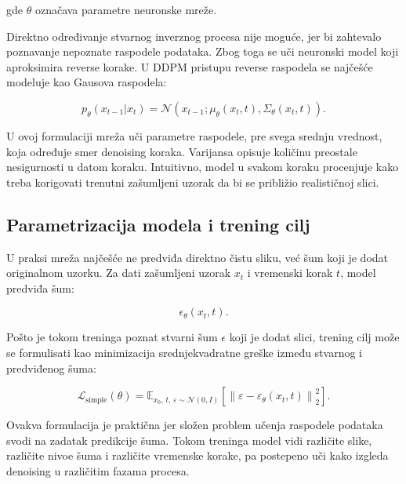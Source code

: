 \documentclass[10pt]{article}
\begin{document}
	gde $\theta$ označava parametre neuronske mreže.
	
	Direktno određivanje stvarnog inverznog procesa nije moguće, jer bi zahtevalo poznavanje nepoznate raspodele podataka. Zbog toga se uči neuronski model koji aproksimira reverse korake. \newline U DDPM pristupu reverse raspodela se najčešće modeluje kao Gausova raspodela:
	
	\begin{equation}
		p_\theta(x_{t-1}|x_t) =
		\mathcal{N}(x_{t-1}; \mu_\theta(x_t,t), \Sigma_\theta(x_t,t)).
	\end{equation} \newline
	
	U ovoj formulaciji mreža uči parametre raspodele, pre svega srednju vrednost, koja određuje smer denoising koraka. Varijansa opisuje količinu preostale nesigurnosti u datom koraku. \newline Intuitivno, model u svakom koraku procenjuje kako treba korigovati trenutni zašumljeni uzorak da bi se približio realističnoj slici.
	
	\subsection{Parametrizacija modela i trening cilj}
	
	U praksi mreža najčešće ne predviđa direktno čistu sliku, već šum koji je dodat originalnom uzorku. Za dati zašumljeni uzorak $x_t$ i vremenski korak $t$, model predviđa šum:
	
	\begin{equation}
		\epsilon_\theta(x_t,t).
	\end{equation} 
	
	Pošto je tokom treninga poznat stvarni šum $\epsilon$ koji je dodat slici, trening cilj može se formulisati kao minimizacija srednjekvadratne greške između stvarnog i predviđenog šuma:
	
	\begin{equation}
		\mathcal{L}_{\mathrm{simple}}(\theta)
		=
		\mathbb{E}_{x_0,\, t,\, \varepsilon \sim \mathcal{N}(0,I)}
		\left[
		\left\|
		\varepsilon -
		\varepsilon_{\theta}(x_t,t)
		\right\|_2^2
		\right].
	\end{equation} \newline
	
	Ovakva formulacija je praktična jer složen problem učenja raspodele podataka svodi na zadatak predikcije šuma. Tokom treninga model vidi različite slike, različite nivoe šuma i različite vremenske korake, pa postepeno uči kako izgleda denoising u različitim fazama procesa.
	
\end{document}
